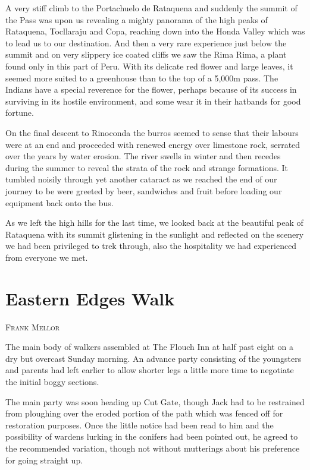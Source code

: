 \documentclass[a5paper,openany,font 10pt]{scrbook}
\makeatletter
\newcommand{\chapterauthor}[1]{%
{\parindent0pt\vspace*{-5pt}%
\linespread{1.1}\large\scshape#1%
\par\nobreak\vspace*{35pt}}
\@afterheading%
}
\makeatother
\begin{document}
A very stiff climb to the Portachuelo de Rataquena and
suddenly the summit of the Pass was upon us revealing a mighty
panorama of the high peaks of Rataquena, Tocllaraju and Copa,
reaching down into the Honda Valley which was to lead us to our
destination. And then a very rare experience   just below the
summit and on very slippery ice coated cliffs we saw the Rima Rima,
a plant found only in this part of Peru. With its delicate
red flower and large leaves, it seemed more suited to a
greenhouse than to the top of a 5,000m pass. The Indians have a
special reverence for the flower, perhaps because of its success
in surviving in its hostile environment, and some wear it in
their hatbands for good fortune.

On the final descent to Rinoconda the burros seemed to sense
that their labours were at an end and proceeded with renewed
energy over limestone rock, serrated over the years by water
erosion. The river swells in winter and then recedes during the
summer to reveal the strata of the rock and strange formations.
It tumbled noisily through yet another cataract as we reached the
end of our journey to be were greeted by beer, sandwiches and
fruit before loading our equipment back onto the bus.

As we left the high hills for the last time, we looked back
at the beautiful peak of Rataquena with its summit glistening in
the sunlight and reflected on the scenery we had been privileged
to trek through, also the hospitality we had experienced from
everyone we met.

\chapter{Eastern Edges Walk}
\label{sec:orgabeefcb}
\chapterauthor{Frank Mellor}

The main body of walkers assembled at The Flouch Inn at half
past eight on a dry but overcast Sunday morning. An advance party
consisting of the youngsters and parents had left earlier to
allow shorter legs a little more time to negotiate the initial
boggy sections.

The main party was soon heading up Cut Gate, though Jack had
to be restrained from ploughing over the eroded portion of the
path which was fenced off for restoration purposes. Once the
little notice had been read to him and the possibility of wardens
lurking in the conifers had been pointed out, he agreed to the
recommended variation, though not without mutterings about his
preference for going straight up.
\end{document}
